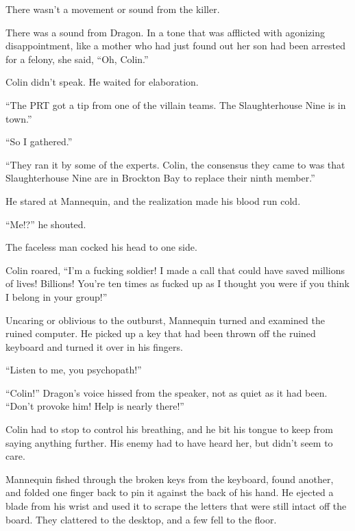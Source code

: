 There wasn't a movement or sound from the killer.



There was a sound from Dragon.  In a tone that was afflicted with agonizing disappointment, like a mother who had just found out her son had been arrested for a felony, she said, ``Oh, Colin.''



Colin didn't speak.  He waited for elaboration.



``The PRT got a tip from one of the villain teams.  The Slaughterhouse Nine is in town.''



``So I gathered.''



``They ran it by some of the experts.  Colin, the consensus they came to was that Slaughterhouse Nine are in Brockton Bay to replace their ninth member.''



He stared at Mannequin, and the realization made his blood run cold.



``Me!?'' he shouted.



The faceless man cocked his head to one side.



Colin roared, ``I'm a fucking soldier!  I made a call that could have saved millions of lives!  Billions!  You're ten times as fucked up as I thought you were if you think I belong in your group!''



Uncaring or oblivious to the outburst, Mannequin turned and examined the ruined computer.  He picked up a key that had been thrown off the ruined keyboard and turned it over in his fingers.



``Listen to me, you psychopath!''



``Colin!''  Dragon's voice hissed from the speaker, not as quiet as it had been.  ``Don't provoke him!  Help is nearly there!''



Colin had to stop to control his breathing, and he bit his tongue to keep from saying anything further.  His enemy had to have heard her, but didn't seem to care.



Mannequin fished through the broken keys from the keyboard, found another, and folded one finger back to pin it against the back of his hand.  He ejected a blade from his wrist and used it to scrape the letters that were still intact off the board.  They clattered to the desktop, and a few fell to the floor.



